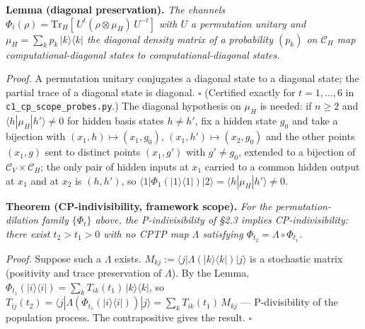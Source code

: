 \documentclass[
]{article}
\begin{document}
\textbf{Lemma (diagonal preservation).} \emph{The channels
\(\Phi_t(\rho) = \mathrm{Tr}_H[\,U^t(\rho \otimes \mu_H)\,U^{-t}]\) with
\(U\) a permutation unitary and
\(\mu_H = \sum_k p_k\,|k\rangle\langle k|\) the diagonal density matrix
of a probability \((p_k)\) on \(\mathcal{C}_H\) map
computational-diagonal states to computational-diagonal states.}

\emph{Proof.} A permutation unitary conjugates a diagonal state to a
diagonal state; the partial trace of a diagonal state is diagonal.
\(\square\) (Certified exactly for \(t = 1, \ldots, 6\) in
\texttt{c1\_cp\_scope\_probes.py}.) The diagonal hypothesis on \(\mu_H\)
is needed: if \(n \geq 2\) and \(\langle h|\mu_H|h'\rangle \neq 0\) for
hidden basis states \(h \neq h'\), fix a hidden state \(g_0\) and take a
bijection with \((x_1, h) \mapsto (x_1, g_0)\),
\((x_1, h') \mapsto (x_2, g_0)\) and the other points \((x_1, g)\) sent
to distinct points \((x_1, g')\) with \(g' \neq g_0\), extended to a
bijection of \(\mathcal{C}_V \times \mathcal{C}_H\); the only pair of
hidden inputs at \(x_1\) carried to a common hidden output at \(x_1\)
and at \(x_2\) is \((h, h')\), so
\(\langle 1|\Phi_1(|1\rangle\langle 1|)|2\rangle = \langle h|\mu_H|h'\rangle \neq 0\).

\textbf{Theorem (CP-indivisibility, framework scope).} \emph{For the
permutation-dilation family \(\{\Phi_t\}\) above, the P-indivisibility
of §2.3 implies CP-indivisibility: there exist \(t_2 > t_1 > 0\) with no
CPTP map \(\Lambda\) satisfying
\(\Phi_{t_2} = \Lambda \circ \Phi_{t_1}\).}

\emph{Proof.} Suppose such a \(\Lambda\) exists.
\(M_{kj} := \langle j|\Lambda(|k\rangle\langle k|)|j\rangle\) is a
stochastic matrix (positivity and trace preservation of \(\Lambda\)). By
the Lemma,
\(\Phi_{t_1}(|i\rangle\langle i|) = \sum_k T_{ik}(t_1)\,|k\rangle\langle k|\),
so
\(T_{ij}(t_2) = \langle j|\Lambda(\Phi_{t_1}(|i\rangle\langle i|))|j\rangle = \sum_k T_{ik}(t_1)\,M_{kj}\)
--- P-divisibility of the population process. The contrapositive gives
the result. \(\square\)
\end{document}
